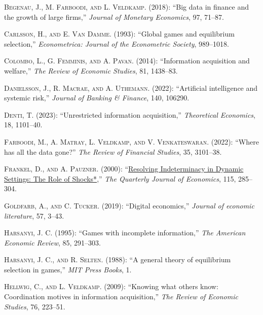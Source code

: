 \documentclass[
]{article}
\newlength{\cslhangindent}
\newlength{\cslentryspacingunit} %
\newenvironment{CSLReferences}[2] %
 {%
  \setlength{\parindent}{0pt}
  \ifodd #1
  \let\oldpar\par
  \def\par{\hangindent=\cslhangindent\oldpar}
  \fi
  \setlength{\parskip}{#2\cslentryspacingunit}
 }%
 {}
\theoremstyle{plain}
\theoremstyle{definition}
\theoremstyle{remark}
\begin{document}
\begin{CSLReferences}{1}{0}
\leavevmode{}%
\textsc{Begenau, J., M. Farboodi, and L. Veldkamp}. (2018): {``Big data
in finance and the growth of large firms,''} \emph{Journal of Monetary
Economics}, 97, 71--87.

\leavevmode{}%
\textsc{Carlsson, H., and E. Van Damme}. (1993): {``Global games and
equilibrium selection,''} \emph{Econometrica: Journal of the Econometric
Society}, 989--1018.

\leavevmode{}%
\textsc{Colombo, L., G. Femminis, and A. Pavan}. (2014): {``Information
acquisition and welfare,''} \emph{The Review of Economic Studies}, 81,
1438--83.

\leavevmode{}%
\textsc{Danielsson, J., R. Macrae, and A. Uthemann}. (2022):
{``Artificial intelligence and systemic risk,''} \emph{Journal of
Banking \& Finance}, 140, 106290.

\leavevmode{}%
\textsc{Denti, T.} (2023): {``Unrestricted information acquisition,''}
\emph{Theoretical Economics}, 18, 1101--40.

\leavevmode{}%
\textsc{Farboodi, M., A. Matray, L. Veldkamp, and V. Venkateswaran}.
(2022): {``Where has all the data gone?''} \emph{The Review of Financial
Studies}, 35, 3101--38.

\leavevmode{}%
\textsc{Frankel, D., and A. Pauzner}. (2000):
{``\href{https://doi.org/10.1162/003355300554746}{{Resolving
Indeterminacy in Dynamic Settings: The Role of Shocks*}},''} \emph{The
Quarterly Journal of Economics}, 115, 285--304.

\leavevmode{}%
\textsc{Goldfarb, A., and C. Tucker}. (2019): {``Digital economics,''}
\emph{Journal of economic literature}, 57, 3--43.

\leavevmode{}%
\textsc{Harsanyi, J. C.} (1995): {``Games with incomplete
information,''} \emph{The American Economic Review}, 85, 291--303.

\leavevmode{}%
\textsc{Harsanyi, J. C., and R. Selten}. (1988): {``A general theory of
equilibrium selection in games,''} \emph{MIT Press Books}, 1.

\leavevmode{}%
\textsc{Hellwig, C., and L. Veldkamp}. (2009): {``Knowing what others
know: Coordination motives in information acquisition,''} \emph{The
Review of Economic Studies}, 76, 223--51.


\end{CSLReferences}
\end{document}
